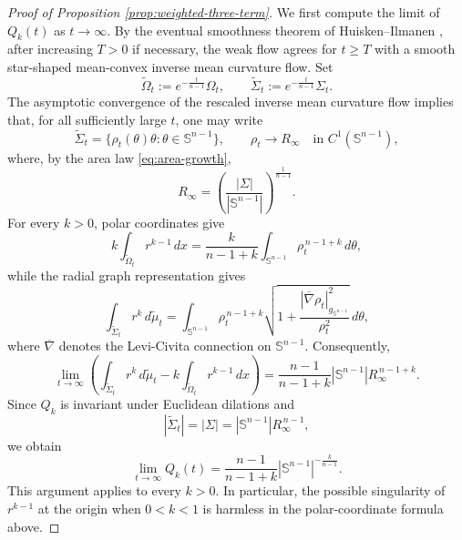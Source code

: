 \documentclass[10pt,a4paper]{amsart}
\numberwithin{equation}{section}
\begin{document}
\begin{proof}[Proof of Proposition \ref{prop:weighted-three-term}]

We first compute the limit of $Q_k(t)$ as $t\to\infty$. By the eventual smoothness theorem of Huisken--Ilmanen \cite[Theorem~2.7]{HI2008}, after increasing $T>0$ if necessary, the weak flow agrees for $t\geq T$ with a smooth star-shaped mean-convex inverse mean curvature flow. Set
\begin{equation*}
    \widetilde\Omega_t:=e^{-\frac{t}{n-1}}\Omega_t,
    \qquad
    \widetilde\Sigma_t:=e^{-\frac{t}{n-1}}\Sigma_t .
\end{equation*}
The asymptotic convergence of the rescaled inverse mean curvature flow \cite{Gerhardt1990,Urbas1990} implies that, for all sufficiently large $t$, one may write
\begin{equation*}
    \widetilde\Sigma_t
    =\{\rho_t(\theta)\theta:\theta\in\mathbb S^{n-1}\},
    \qquad
    \rho_t\longrightarrow R_\infty
    \quad\text{in }C^1(\mathbb S^{n-1}),
\end{equation*}
where, by the area law \eqref{eq:area-growth},
\begin{equation*}
    R_\infty
    =\left(\frac{|\Sigma|}{|\mathbb S^{n-1}|}\right)^{\frac1{n-1}}.
\end{equation*}
For every $k>0$, polar coordinates give
\begin{equation*}
    k\int_{\widetilde\Omega_t}r^{k-1}\,dx
    =\frac{k}{n-1+k}
      \int_{\mathbb S^{n-1}}\rho_t^{\,n-1+k}\,d\theta,
\end{equation*}
while the radial graph representation gives
\begin{equation*}
    \int_{\widetilde\Sigma_t}r^k\,d\widetilde\mu_t
    =
    \int_{\mathbb S^{n-1}}
       \rho_t^{\,n-1+k}
       \sqrt{1+\frac{|\overline{\nabla}\rho_t|_{g_{\mathbb{S}^{n-1}}}^2}{\rho_t^2}}\,d\theta,
\end{equation*}
where $\overline{\nabla}$ denotes the Levi-Civita connection on $\mathbb{S}^{n-1}$. Consequently,
\begin{equation*}
    \lim_{t\to\infty}
    \left(
      \int_{\widetilde\Sigma_t}r^k\,d\widetilde\mu_t
      -k\int_{\widetilde\Omega_t}r^{k-1}\,dx
    \right)
    =
    \frac{n-1}{n-1+k}
    |\mathbb S^{n-1}|R_\infty^{\,n-1+k}.
\end{equation*}
Since $Q_k$ is invariant under Euclidean dilations and
\begin{equation*}
    |\widetilde\Sigma_t|
    =|\Sigma|
    =|\mathbb S^{n-1}|R_\infty^{\,n-1},
\end{equation*}
we obtain
\begin{equation}\label{eq:limit-Q}
    \lim_{t\to\infty}Q_k(t)
    =
    \frac{n-1}{n-1+k}
    |\mathbb S^{n-1}|^{-\frac{k}{n-1}}.
\end{equation}
This argument applies to every $k>0$. In particular, the possible singularity of $r^{k-1}$ at the origin when $0<k<1$ is harmless in the polar-coordinate formula above.


\end{proof}
\end{document}

